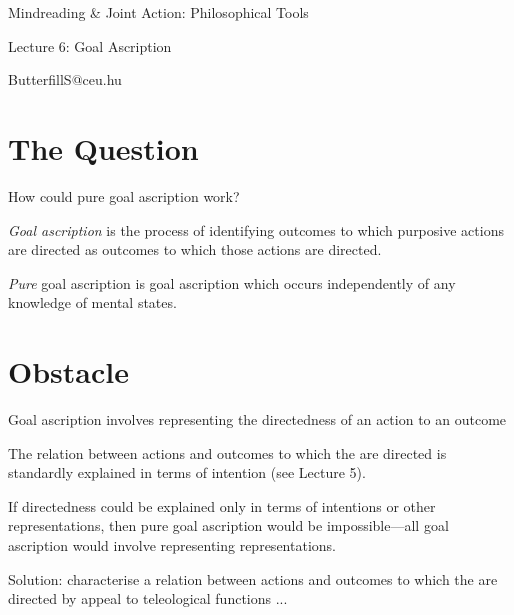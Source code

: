\documentclass[11pt]{extarticle}
\date{}
\begin{document}
\begin{multicols}{3}

\setlength\footnotesep{1em}









\begin{center}
{\Large
Mindreading \& Joint Action: Philosophical Tools}

Lecture 6: Goal Ascription


ButterfillS@ceu.hu
\end{center}


\section{The Question}
\newcommand{\theQuestion}{How could pure goal ascription work? }
\theQuestion

\newcommand{\dfGoalAscription}{\emph{Goal ascription} is the process of identifying outcomes to which purposive actions are directed as outcomes to which those actions are directed.}

\dfGoalAscription{}

\emph{Pure} goal ascription is goal ascription which occurs independently of any knowledge of mental states.


\section{Obstacle}
Goal ascription involves representing the directedness of an action to an outcome

The relation between actions and outcomes to which the are directed is standardly explained in terms of intention (see Lecture 5).

If directedness could be explained only in terms of intentions or other representations, then pure goal ascription would be impossible---all goal ascription would involve representing representations.

Solution: characterise a relation between actions and outcomes to which the are directed by appeal to teleological functions ...



\end{multicols}
\end{document}
